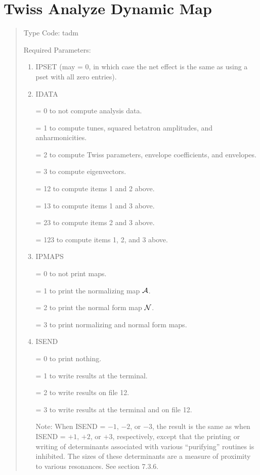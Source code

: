 \section{Twiss Analyze Dynamic Map}  
\begin{quotation}
\noindent     Type Code:  tadm
\vspace{5mm}

\noindent Required Parameters:
\begin{enumerate}
      \item  IPSET (may = 0, in which case the net effect is the same as
	  using a pset with all zero entries).

      \item  IDATA

             = 0 to not compute analysis data.

             = 1 to compute tunes, squared betatron amplitudes, and anharmonicities.

             = 2 to compute Twiss parameters, envelope coefficients, and envelopes.

             = 3 to compute eigenvectors.

             = 12 to compute items 1 and 2 above.

             = 13 to compute items 1 and 3 above.

             = 23 to compute items 2 and 3 above.

             = 123 to compute items 1, 2, and 3 above.

      \item  IPMAPS

             = 0 to not print maps.

             = 1 to print the normalizing map ${\cal A}$.

             = 2 to print the normal form map ${\cal N}$.

             = 3 to print normalizing and normal form maps.

      \item  ISEND

             = 0 to print nothing.

             = 1 to write results at the terminal.

             = 2 to write results on file 12.

             = 3 to write results at the terminal and on file 12.

             Note:  When ISEND = $-1$, $-2$, or $-3$, the result is the same as
             when ISEND = $+1$, $+2$, or $+3$, respectively, except that the
             printing or writing of determinants associated with various
             ``purifying'' routines is inhibited.  The sizes of these
             determinants are a measure of proximity to various resonances.  See section 7.3.6.


\end{enumerate}
\end{quotation}
